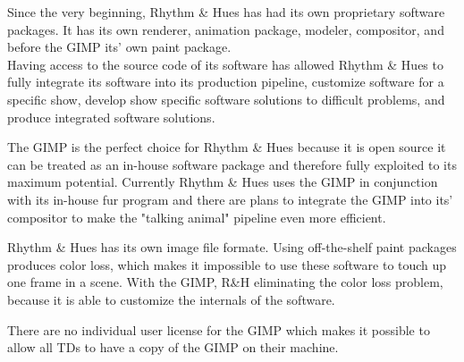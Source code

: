 Since the very beginning, Rhythm \& Hues has had its own proprietary software packages. It has its own renderer, animation package, modeler, compositor, and before the GIMP its' own paint package.\\ 

Having access to the source code of its software has allowed Rhythm \& Hues to fully integrate its software into its production pipeline, customize software for a specific show, develop show specific software solutions to difficult problems, and produce integrated software solutions.

The GIMP is the perfect choice for Rhythm \& Hues because it is open source it can be treated as an in-house software package and therefore fully exploited to its maximum potential. Currently Rhythm \& Hues uses the GIMP in conjunction with its in-house fur program and there are plans to integrate the GIMP into its' compositor to make the "talking animal" pipeline even more efficient.

Rhythm \& Hues has its own image file formate. Using off-the-shelf paint packages produces color loss, which makes it impossible to use these software to touch up one frame in a scene. With the GIMP, R\&H eliminating the color loss problem, because it is able to customize the internals of the software. 

There are no individual user license for the GIMP which makes it possible to allow all TDs to have a copy of the GIMP on their machine. 


 
